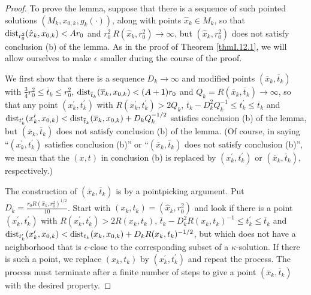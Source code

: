 \begin{proof}
To prove the lemma,
suppose that there is
a sequence of such pointed solutions
$(M_k, x_{0,k}, g_k(\cdot))$, along with points
$\hat{x}_k \in M_k$, so that $\operatorname{dist}_{r_0^2}(\hat{x}_k, x_{0,k}) <
A r_0$ and $r_0^2 \: R(\hat{x}_k, r_0^2) \rightarrow \infty$, but
$(\hat{x}_k, r_0^2)$ does not satisfy conclusion (b) of the
lemma. As in the proof of Theorem \ref{thmI.12.1}, we will allow ourselves to make
$\epsilon$ smaller during the course of the proof.

We first show that there is a sequence $D_k \rightarrow \infty$
and modified points $(\overline{x}_k, \overline{t}_k)$
with $\frac{3}{4} r_0^{2} \le \overline{t}_k \le r_0^{2}$,
$\operatorname{dist}_{\overline{t}_k}(\overline{x}_k, x_{0,k}) < (A+1) r_0$ and
$Q_k = R(\overline{x}_k, \overline{t}_k) \rightarrow \infty$,
so that any point
$(x^\prime_k, t^\prime_k)$ with $R(x^\prime_k, t^\prime_k) > 2Q_k$,
$\overline{t}_k - D_k^2 Q_k^{-1} \le
t^\prime_k \le \overline{t}_k$ and
$\operatorname{dist}_{t^\prime_k}(x^\prime_k, {x}_{0,k})
< \operatorname{dist}_{\overline{t}_k}(\overline{x}_k,
x_{0,k}) +
D_k Q_k^{-1/2}$ satisfies conclusion (b) of the lemma,
but $(\overline{x}_k, \overline{t}_k)$ does not satisfy conclusion (b) of
the lemma. (Of course, in saying ``$(x^\prime_k, t^\prime_k)$
satisfies conclusion (b)'' or
``$(\overline{x}_k, \overline{t}_k)$ does not satisfy conclusion (b)'', we mean that
the $(x,t)$ in conclusion (b) is replaced by $(x^\prime_k, t^\prime_k)$ or
$(\overline{x}_k, \overline{t}_k)$, respectively.)

The construction of $(\overline{x}_k, \overline{t}_k)$ is by a pointpicking
argument.
Put $D_k = \frac{r_0 R(\hat{x}_k, r_0^2)^{1/2}}{10}$.
Start with $(x_k, t_k) = (\hat{x}_k, r_0^2)$
and look if there is a point
$(x^\prime_k, t^\prime_k)$ with $R(x^\prime_k, t^\prime_k) > 2
R(x_k, t_k)$,
$\overline{t}_k - D_k^2 R(x_k, t_k)^{-1} \le
t^\prime_k \le \overline{t}_k$ and
$\operatorname{dist}_{t^\prime_k}(x^\prime_k, {x}_{0,k})
< \operatorname{dist}_{{t}_k}({x}_k,
x_{0,k}) +
D_k R(x_k, t_k)^{-1/2}$, but
which does not have a neighborhood that is
$\epsilon$-close to the corresponding subset of a $\kappa$-solution.
If there is such a point, we replace $(x_k, t_k)$ by $(x^\prime_k,
t^\prime_k)$ and repeat the process.  The process must terminate after
a finite number of steps to give a point
$(\overline{x}_k, \overline{t}_k)$ with the desired property.


\end{proof}
